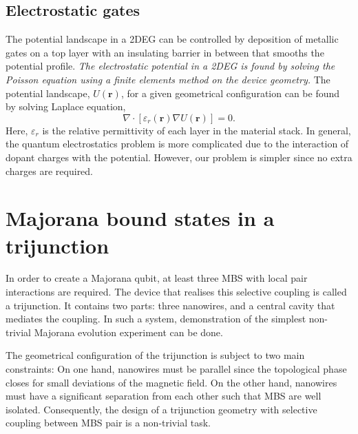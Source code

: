 \subsection{Electrostatic gates}

The potential landscape in a 2DEG can be controlled by deposition of metallic gates on a top layer with an insulating barrier in between that smooths the potential profile.
\textit{The electrostatic potential in a 2DEG is found by solving the Poisson equation using a finite elements method on the device geometry.}
The potential landscape, $U(\mathbf{r})$, for a given geometrical configuration can be found by solving Laplace equation,
\begin{equation}
\nabla \cdot \left[ \varepsilon_r(\mathbf{r}) \nabla U(\mathbf{r}) \right] = 0.
\end{equation}
Here, $\varepsilon_r$ is the relative permittivity of each layer in the material stack.
In general, the quantum electrostatics problem is more complicated due to the interaction of dopant charges with the potential.
However, our problem is simpler since no extra charges are required.


\section{Majorana bound states in a trijunction}

In order to create a Majorana qubit, at least three MBS with local pair interactions are required.
The device that realises this selective coupling is called a trijunction.
It contains two parts: three nanowires, and a central cavity that mediates the coupling.
In such a system, demonstration of the simplest non-trivial Majorana evolution experiment can be done.

The geometrical configuration of the trijunction is subject to two main constraints:
On one hand, nanowires must be parallel since the topological phase closes for small deviations of the magnetic field.
On the other hand, nanowires must have a significant separation from each other such that MBS are well isolated.
Consequently, the design of a trijunction geometry with selective coupling between MBS pair is a non-trivial task.

